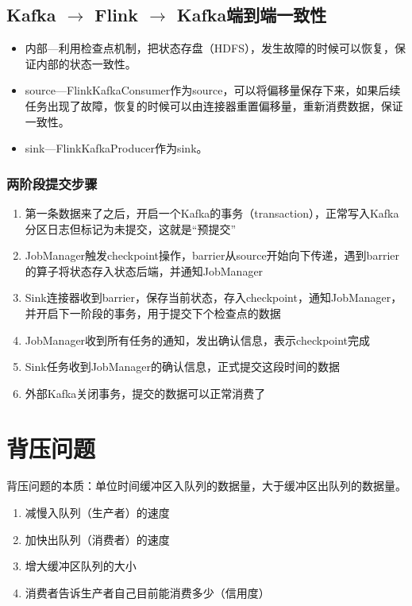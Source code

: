 \documentclass[cn,11pt,chinese]{elegantbook}
\begin{document}
\section{Kafka $\rightarrow$ Flink $\rightarrow$ Kafka端到端一致性}

\begin{itemize}
  \item 内部—利用检查点机制，把状态存盘（HDFS），发生故障的时候可以恢复，保证内部的状态一致性。
  \item source—FlinkKafkaConsumer作为source，可以将偏移量保存下来，如果后续任务出现了故障，恢复的时候可以由连接器重置偏移量，重新消费数据，保证一致性。
  \item sink—FlinkKafkaProducer作为sink。
\end{itemize}

\subsection{两阶段提交步骤}

\begin{enumerate}
  \item 第一条数据来了之后，开启一个Kafka的事务（transaction），正常写入Kafka分区日志但标记为未提交，这就是“预提交”
  \item JobManager触发checkpoint操作，barrier从source开始向下传递，遇到barrier的算子将状态存入状态后端，并通知JobManager
  \item Sink连接器收到barrier，保存当前状态，存入checkpoint，通知JobManager，并开启下一阶段的事务，用于提交下个检查点的数据
  \item JobManager收到所有任务的通知，发出确认信息，表示checkpoint完成
  \item Sink任务收到JobManager的确认信息，正式提交这段时间的数据
  \item 外部Kafka关闭事务，提交的数据可以正常消费了
\end{enumerate}

\chapter{背压问题}

背压问题的本质：单位时间缓冲区入队列的数据量，大于缓冲区出队列的数据量。

\begin{enumerate}
  \item 减慢入队列（生产者）的速度
  \item 加快出队列（消费者）的速度
  \item 增大缓冲区队列的大小
  \item 消费者告诉生产者自己目前能消费多少（信用度）
\end{enumerate}
\end{document}
